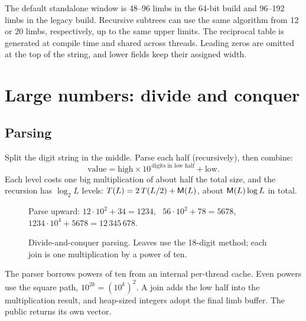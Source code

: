 The default standalone window is 48--96 limbs in the 64-bit build and
96--192 limbs in the legacy build. Recursive subtrees can use the same
algorithm from 12 or 20 limbs, respectively, up to the same upper
limits. The reciprocal table is generated at compile time and shared
across threads. Leading zeros are omitted at the top of the string,
and lower fields keep their assigned width.

\section{Large numbers: divide and conquer}

\subsection{Parsing}

Split the digit string in the middle. Parse each half (recursively), then combine:
\[
\text{value} = \text{high} \times 10^{\,\text{digits in low half}} + \text{low} .
\]
Each level costs one big multiplication of about half the total size, and the recursion has
$\log_2 L$ levels: $T(L) = 2\,T(L/2) + \mathsf{M}(L)$, about $\mathsf{M}(L)\log L$ in total.

\begin{figure}[ht]
\centering
{}

\smallskip
{\small Parse upward: $12 \cdot 10^2 + 34 = 1234$, \ $56\cdot 10^2 + 78 = 5678$, \
$1234 \cdot 10^4 + 5678 = 12\,345\,678$.}
\caption{Divide-and-conquer parsing. Leaves use the 18-digit method; each join is one
multiplication by a power of ten.}
\end{figure}

The parser borrows powers of ten from an internal per-thread cache.
Even powers use the square path, $10^{2k}=(10^k)^2$. A join adds the low
half into the multiplication result, and heap-sized integers adopt the
final limb buffer. The public \code{Pow10} returns its own vector.

